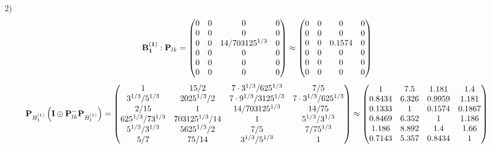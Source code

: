 \documentclass[10pt,a4paper]{article}
\begin{document}
	2)
	\[
		\bold{B_1^{(1)}}: \bold{P}_{lk} = 
		\begin{pmatrix}
			{{0}}{} & {{0}}{} & {{0}}{} & {{0}}{} \\
			{{0}}{} & {{0}}{} & {{0}}{} & {{0}}{} \\
			{{0}}{} & {{0}}{} & {{14}} / {{703125^ {1 / 3}}} & {{0}}{} \\
			{{0}}{} & {{0}}{} & {{0}}{} & {{0}}{} \\
			{{0}}{} & {{0}}{} & {{0}}{} & {{0}}{} \\
			{{0}}{} & {{0}}{} & {{0}}{} & {{0}}{} \\
		\end{pmatrix}
		\approx
		\begin{pmatrix}
			0        & 0        & 0        & 0        \\
			0        & 0        & 0        & 0        \\
			0        & 0        & 0.1574   & 0        \\
			0        & 0        & 0        & 0        \\
			0        & 0        & 0        & 0        \\
			0        & 0        & 0        & 0        \\
		\end{pmatrix}
	\]
	\[
		\bold{P}_{B_1^{(1)}}\left(\bold{I} \oplus \bold{P}_{lk}^{-}\bold{P}_{B_1^{(1)}}\right) = 
		\begin{pmatrix}
			{1}{} & {{15}} / {{2}} & {{7} \cdot {3^ {1 / 3}}} / {{625^ {1 / 3}}} & {{7}} / {{5}} \\
			{{3^ {1 / 3}}} / {{5^ {1 / 3}}} & {{2025^ {1 / 3}}} / {{2}} & {{7} \cdot {9^ {1 / 3}}} / {{3125^ {1 / 3}}} & {{7} \cdot {3^ {1 / 3}}} / {{625^ {1 / 3}}} \\
			{{2}} / {{15}} & {1}{} & {{14}} / {{703125^ {1 / 3}}} & {{14}} / {{75}} \\
			{{625^ {1 / 3}}} / {{7}{3^ {1 / 3}}} & {{703125^ {1 / 3}}} / {{14}} & {1}{} & {{5^ {1 / 3}}} / {{3^ {1 / 3}}} \\
			{{5^ {1 / 3}}} / {{3^ {1 / 3}}} & {{5625^ {1 / 3}}} / {{2}} & {{7}} / {{5}} & {{7}} / {{75^ {1 / 3}}} \\
			{{5}} / {{7}} & {{75}} / {{14}} & {{3^ {1 / 3}}} / {{5^ {1 / 3}}} & {1}{} \\
		\end{pmatrix}
		\approx
		\begin{pmatrix}
			1        & 7.5      & 1.181    & 1.4      \\
			0.8434   & 6.326    & 0.9959   & 1.181    \\
			0.1333   & 1        & 0.1574   & 0.1867   \\
			0.8469   & 6.352    & 1        & 1.186    \\
			1.186    & 8.892    & 1.4      & 1.66     \\
			0.7143   & 5.357    & 0.8434   & 1        \\
		\end{pmatrix}
	\]
\end{document}
